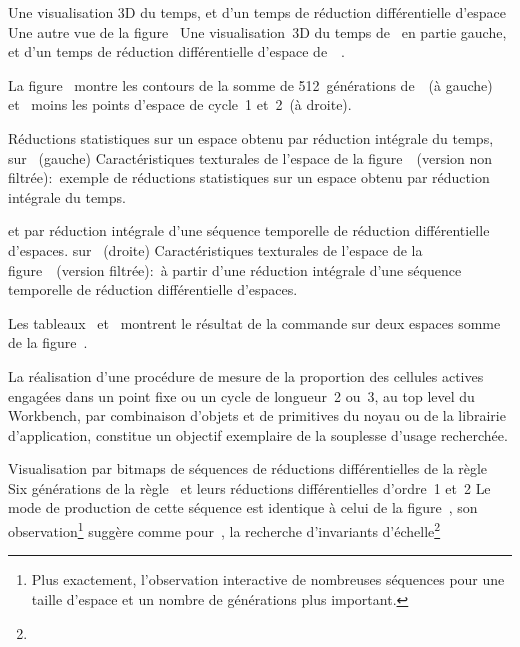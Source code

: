 %
{Une visualisation 3D du temps, et d'un temps de r\'eduction diff\'erentiel\-le d'espace}%
{Une autre vue de la figure~}%
{Une visualisation~3D du temps de~ en partie gauche, %
  et d'un temps de r\'eduction diff\'erentielle
  d'espace de~~.}

\noindent%
La figure~ montre les contours de
la somme de 512~g\'en\'erations de~~(\`a gauche)
et~ moins les points d'espace de cycle~1 et~2~(\`a droite). %

%
{R\'eductions statistiques sur un espace obtenu par r\'eduction int\'egrale
  du temps,}%
{ sur ~(gauche)}%
{Caract\'eristiques texturales de l'espace de la
  figure~~(version non
  filtr\'ee):~exemple de r\'eductions statistiques sur un espace obtenu par
  r\'eduction int\'egrale du temps.}%

%
{et par r\'eduction int\'egrale d'une s\'equence
  temporelle de r\'e\-duc\-tion diff\'erentiel\-le d'espaces.}%
{ sur ~(droite)}%
{Caract\'eristiques texturales de l'espace de la
  figure~\protect{}~(version
  filtr\'ee):~\`a partir d'une r\'eduction int\'egrale d'une s\'equence
  temporelle de r\'eduction diff\'erentielle d'espaces.}

\noindent Les tableaux~
et~ montrent le r\'esultat de la commande
 sur deux espaces somme de la
figure~. %

La r\'ealisation d'une proc\'edure de mesure de la proportion des cellules
actives engag\'ees dans un point fixe ou un cycle de longueur~2 ou~3, au
top level du Workbench, par combinaison d'objets et de primitives du
noyau ou de la librairie d'application, constitue un objectif
exemplaire de la souplesse d'usage recherch\'ee. %

%
{Visualisation par bitmaps de s\'equences de r\'eductions dif\-f\'erentiel\-les
  de la r\`egle~}%
{Six g\'en\'erations de la r\`egle~ et leurs r\'eductions dif\-f\'e\-ren\-tiel\-les
  d'ordre~1 et~2}%
{Le mode de production de cette s\'equence est identique \`a celui de la
  figure~, son observation\footnote{%
    Plus exactement, l'observation interactive de nombreuses s\'equences
    pour une taille d'espace et un nombre de g\'en\'erations plus
    important.} %
    sugg\`ere comme pour~, la recherche d'invariants
    d'\'echelle\footnote{%
      }}

